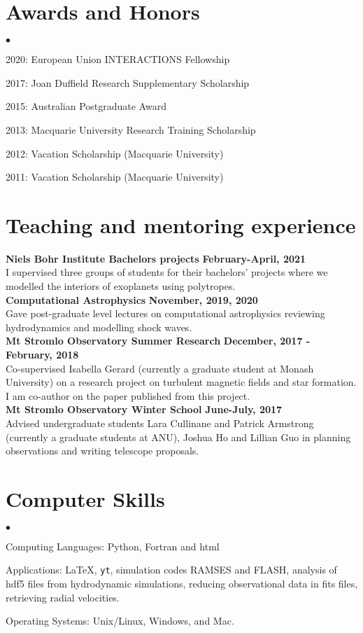 \documentclass[margin,line]{res}
\newenvironment{list2}{
	\begin{list}{$\bullet$}{%
			\setlength{\itemsep}{0in}
			\setlength{\parsep}{0in} \setlength{\parskip}{0in}
			\setlength{\topsep}{0in} \setlength{\partopsep}{0in} 
			\setlength{\leftmargin}{0.2in}}}{\end{list}}
\begin{document}
\begin{resume}
		\section{\sc Awards and Honors}
		\begin{list2}
			\item 2020: European Union INTERACTIONS Fellowship
			\item 2017: Joan Duffield Research Supplementary Scholarship
			\item 2015: Australian Postgraduate Award
			\item 2013: Macquarie University Research Training Scholarship
			\item 2012: Vacation Scholarship (Macquarie University)
			\item 2011: Vacation Scholarship (Macquarie University)
		\end{list2}
		
		\section{\sc Teaching and mentoring experience}
		{\bf  Niels Bohr Institute Bachelors projects} \hfill {\bf February-April, 2021}\\
		I supervised three groups of students for their bachelors' projects where we modelled the interiors of exoplanets using polytropes.\\
		{\bf Computational Astrophysics} \hfill {\bf November, 2019, 2020}\\
		Gave post-graduate level lectures on computational astrophysics reviewing hydrodynamics and modelling shock waves.\\
		{\bf Mt Stromlo Observatory Summer Research} \hfill {\bf December, 2017 - February, 2018}\\
		Co-supervised Isabella Gerard (currently a graduate student at Monash University) on a research project on turbulent magnetic fields and star formation. I am co-author on the paper published from this project.\\
		{\bf Mt Stromlo Observatory Winter School} \hfill {\bf June-July, 2017}\\
		Advised undergraduate students Lara Cullinane and Patrick Armstrong (currently a graduate students at ANU), Joshua Ho and Lillian Guo in planning observations and writing telescope proposals.
		
		\section{\sc Computer Skills} 
		\begin{list2}
			\item Computing Languages: Python, Fortran and html
			\item Applications: \LaTeX , \texttt{yt}, simulation codes RAMSES and FLASH, analysis of hdf5 files from hydrodynamic simulations, reducing observational data in fits files, retrieving radial velocities.  
			\item Operating Systems:  Unix/Linux, Windows, and Mac.
		\end{list2}
		

\end{resume}
\end{document}
